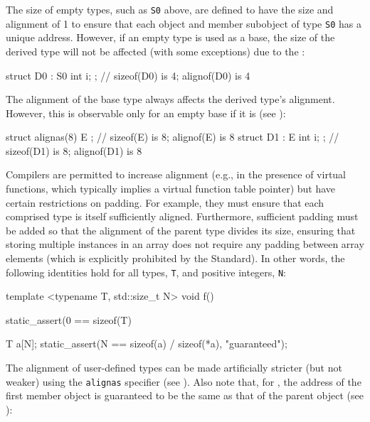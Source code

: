 \noindent The size of empty types, such as \lstinline!S0! above, are defined to have the size and alignment of 1 to ensure that each object and member subobject of type \lstinline!S0! has a unique address. However, if an empty type is used as a base, the size of the derived type will not be affected (with some exceptions) due to the  :

\begin{emcppslisting}
struct D0 : S0 { int i; };  // sizeof(D0) is 4; alignof(D0) is 4
\end{emcppslisting}

The alignment of the base type always affects the derived type's alignment. However, this is observable only for an empty base if it is  (see ):

\begin{emcppslisting}
struct alignas(8) E { };   // sizeof(E)  is 8; alignof(E)  is 8
struct D1 : E { int i; };  // sizeof(D1) is 8; alignof(D1) is 8
\end{emcppslisting}

Compilers are permitted to increase alignment
(e.g., in the presence of virtual functions, which typically implies a virtual function table pointer) but have certain restrictions
on padding. For example, they must ensure that each comprised type is
itself sufficiently aligned.  Furthermore, sufficient padding must be added so that the alignment of the parent type divides its size, ensuring that storing multiple instances in an
array does not require any padding between array elements (which is explicitly prohibited by the Standard). In other words, the following identities hold for all types, \lstinline!T!, and positive integers,
\lstinline!N!:

\begin{emcppslisting}
template <typename T, std::size_t N>
void f()
{
    static_assert(0 == sizeof(T) %

    T a[N];
    static_assert(N == sizeof(a) / sizeof(*a), "guaranteed");
}
\end{emcppslisting}

\noindent The alignment of user-defined types can be made artificially stricter
  (but not weaker) using the \lstinline!alignas! specifier (see ).
  Also note that, for , the address of the
  first member object is guaranteed to be the same as that of the parent
  object (see ):

